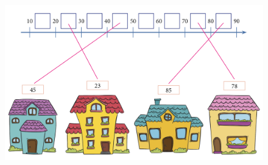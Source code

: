 
\begin{figure}[htpb!]
\includegraphics[width=\textwidth]{./media/SAEB_1ANO_MAT_FIGURA14.png}
\end{figure}



